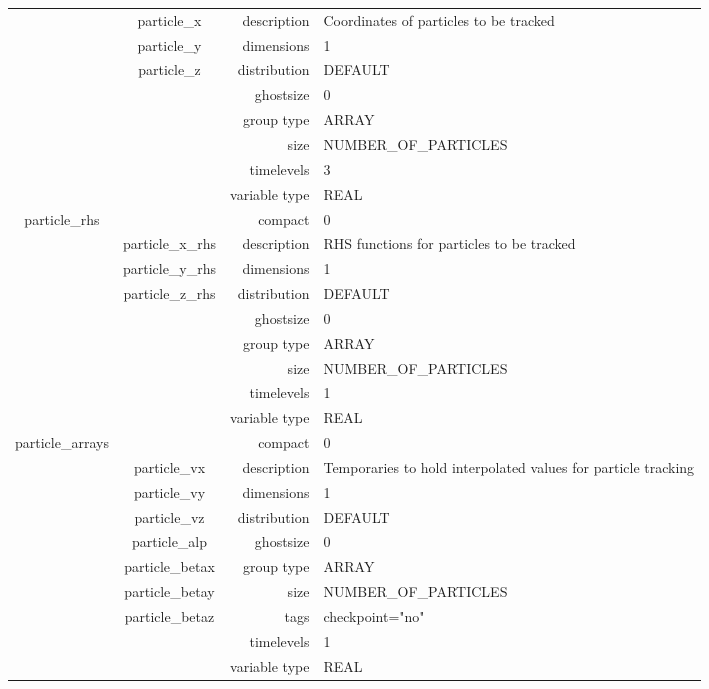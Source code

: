 \begin{tabular*}{150mm}{|c|c@{\extracolsep{\fill}}|rl|}
 & particle\_x & description & Coordinates of particles to be tracked \\ 
 & particle\_y & dimensions & 1 \\ 
 & particle\_z & distribution & DEFAULT \\ 
 &  & ghostsize & 0 \\ 
 &  & group type & ARRAY \\ 
 &  & size & NUMBER\_OF\_PARTICLES \\ 
 &  & timelevels & 3 \\ 
 &  & variable type & REAL \\ 
\hline 
particle\_rhs &  & compact & 0 \\ 
 & particle\_x\_rhs & description & RHS functions for particles to be tracked \\ 
 & particle\_y\_rhs & dimensions & 1 \\ 
 & particle\_z\_rhs & distribution & DEFAULT \\ 
 &  & ghostsize & 0 \\ 
 &  & group type & ARRAY \\ 
 &  & size & NUMBER\_OF\_PARTICLES \\ 
 &  & timelevels & 1 \\ 
 &  & variable type & REAL \\ 
\hline 
particle\_arrays &  & compact & 0 \\ 
 & particle\_vx & description & Temporaries to hold interpolated values for particle tracking \\ 
 & particle\_vy & dimensions & 1 \\ 
 & particle\_vz & distribution & DEFAULT \\ 
 & particle\_alp & ghostsize & 0 \\ 
 & particle\_betax & group type & ARRAY \\ 
 & particle\_betay & size & NUMBER\_OF\_PARTICLES \\ 
 & particle\_betaz & tags & checkpoint="no" \\ 
 &  & timelevels & 1 \\ 
 &  & variable type & REAL \\ 
\hline 
\end{tabular*} 



\vspace{5mm}
\vspace{5mm}

